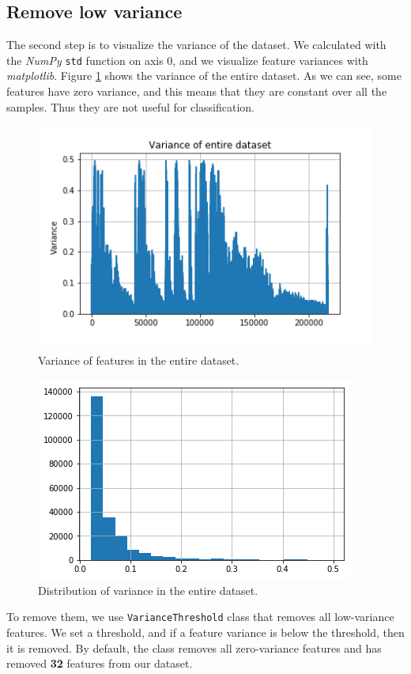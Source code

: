 \subsection{Remove low variance}
The second step is to visualize the variance of the dataset. We calculated with the \textit{NumPy} \texttt{std} function on axis 0, and we visualize feature variances with \textit{matplotlib}. Figure \ref{fig:var_all} shows the variance of the entire dataset. As we can see, some features have zero variance, and this means that they are constant over all the samples. Thus they are not useful for classification.

\begin{figure}[!h]
	\centering
	\includegraphics[width=0.6\columnwidth]{variance-all2.png}
	\caption{Variance of features in the entire dataset.}
	\label{fig:var_all}
\end{figure}

\begin{figure}[!h]
	\centering
	\includegraphics[width=0.6\columnwidth]{variance-distr.png}
	\caption{Distribution of variance in the entire dataset.}
	\label{fig:var_distr}
\end{figure}

To remove them, we use \texttt{VarianceThreshold} class that removes all low-variance features. We set a threshold, and if a feature variance is below the threshold, then it is removed. By default, the class removes all zero-variance features and has removed \textbf{32} features from our dataset.

